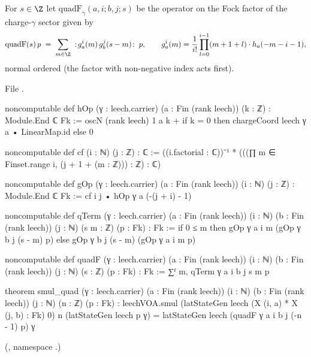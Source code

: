\begin{definition}\label{ch12:def:quadF}
For $s\in\Z$ let $\mathrm{quadF}_\gamma(a,i;b,j;s)$ be the operator on the Fock factor of the charge-$\gamma$
sector given by
\begin{equation*}
 \mathrm{quadF}(s)\,p \;=\;\sum_{m\in\Z}\;:\!g^i_a(m)\,g^j_b(s-m)\!:\;p,\qquad
 g^i_a(m) = \frac{1}{i!}\prod_{l=0}^{i-1}(m+1+l)\cdot h_a(-m-i-1),
\end{equation*}
normal ordered (the factor with non-negative index acts first).
\end{definition}
File .
\begin{leancode}
noncomputable def hOp (γ : leech.carrier) (a : Fin (rank leech)) (k : ℤ) : Module.End ℂ Fk :=
  oscN (rank leech) 1 a k + if k = 0 then chargeCoord leech γ a • LinearMap.id else 0

noncomputable def cf (i : ℕ) (j : ℤ) : ℂ :=
  ((i.factorial : ℂ))⁻¹ * (((∏ m ∈ Finset.range i, (j + 1 + (m : ℤ))) : ℤ) : ℂ)

noncomputable def gOp (γ : leech.carrier) (a : Fin (rank leech)) (i : ℕ) (j : ℤ) :
    Module.End ℂ Fk :=
  cf i j • hOp γ a (-(j + i) - 1)

noncomputable def qTerm (γ : leech.carrier) (a : Fin (rank leech)) (i : ℕ) (b : Fin (rank leech))
    (j : ℕ) (s m : ℤ) (p : Fk) : Fk :=
  if 0 ≤ m then gOp γ a i m (gOp γ b j (s - m) p) else gOp γ b j (s - m) (gOp γ a i m p)

noncomputable def quadF (γ : leech.carrier) (a : Fin (rank leech)) (i : ℕ) (b : Fin (rank leech))
    (j : ℕ) (s : ℤ) (p : Fk) : Fk :=
  ∑ᶠ m, qTerm γ a i b j s m p

theorem smul_quad (γ : leech.carrier) (a : Fin (rank leech)) (i : ℕ) (b : Fin (rank leech))
    (j : ℕ) (n : ℤ) (p : Fk) :
    leechVOA.smul (latStateGen leech (X (i, a) * X (j, b) : Fk) 0) n (latStateGen leech p γ)
      = latStateGen leech (quadF γ a i b j (-n - 1) p) γ
\end{leancode}
(, namespace .)
